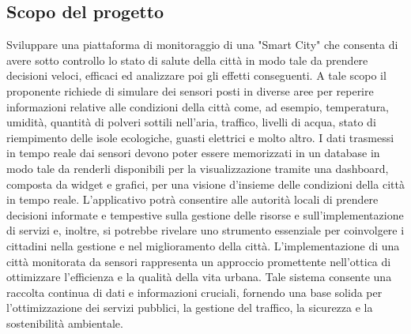 \subsection{Scopo del progetto}
Sviluppare una piattaforma di monitoraggio di una "Smart City" che consenta di avere sotto
controllo lo stato di salute della città in modo tale da prendere decisioni veloci, efficaci ed
analizzare poi gli effetti conseguenti. A tale scopo il proponente richiede di simulare dei
 sensori posti in diverse aree per reperire informazioni relative alle condizioni della città come,
ad esempio, temperatura, umidità, quantità di polveri sottili nell’aria, traffico, livelli di acqua,
stato di riempimento delle isole ecologiche, guasti elettrici e molto altro.
I dati trasmessi in tempo reale dai sensori devono poter essere memorizzati in un database in
modo tale da renderli disponibili per la visualizzazione tramite una dashboard, composta da
widget e grafici, per una visione d’insieme delle condizioni della città in tempo reale.
L’applicativo potrà consentire alle autorità locali di prendere decisioni informate e tempestive
sulla gestione delle risorse e sull’implementazione di servizi e, inoltre, si potrebbe rivelare uno
strumento essenziale per coinvolgere i cittadini nella gestione e nel miglioramento della città.
L’implementazione di una città monitorata da sensori rappresenta un approccio promettente
nell’ottica di ottimizzare l’efficienza e la qualità della vita urbana. Tale sistema consente una
raccolta continua di dati e informazioni cruciali, fornendo una base solida per l’ottimizzazione
dei servizi pubblici, la gestione del traffico, la sicurezza e la sostenibilità ambientale.
